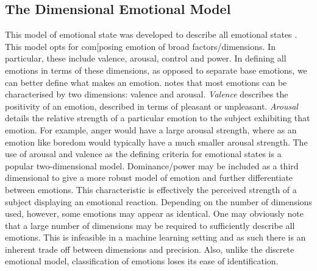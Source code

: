 \subsection{The Dimensional Emotional Model}
This model of emotional state was developed to describe all emotional states \cite{RUSSELL1977}. This model opts for com[posing emotion of broad factors/dimensions. In particular, these include valence, arousal, control and power. In defining all emotions in terms of these dimensions, as opposed to separate base emotions, we can better define what makes an emotion. \cite{nicolaou2011} notes that most emotions can be characterised by two dimensions: valence and arousal. \textit{Valence} describes the positivity of an emotion, described in terms of pleasant or unpleasant. \textit{Arousal} details the relative strength of a particular emotion to the subject exhibiting that emotion. For example, anger would have a large arousal strength, where as an emotion like boredom would typically have a much smaller arousal strength. The use of arousal and valence as the defining criteria for emotional states is a popular two-dimensional model. Dominance/power may be included as a third dimensional to give a more robust model of emotion and further differentiate between emotions. This characteristic is effectively the perceived strength of a subject displaying an emotional reaction. Depending on the number of dimensions used, however, some emotions may appear as identical. One may obviously note that a large number of dimensions may be required to sufficiently describe all emotions. This is infeasible in a machine learning setting and as such there is an inherent trade off between dimensions and precision. Also, unlike the discrete emotional model, classification of emotions loses its ease of identification. 

